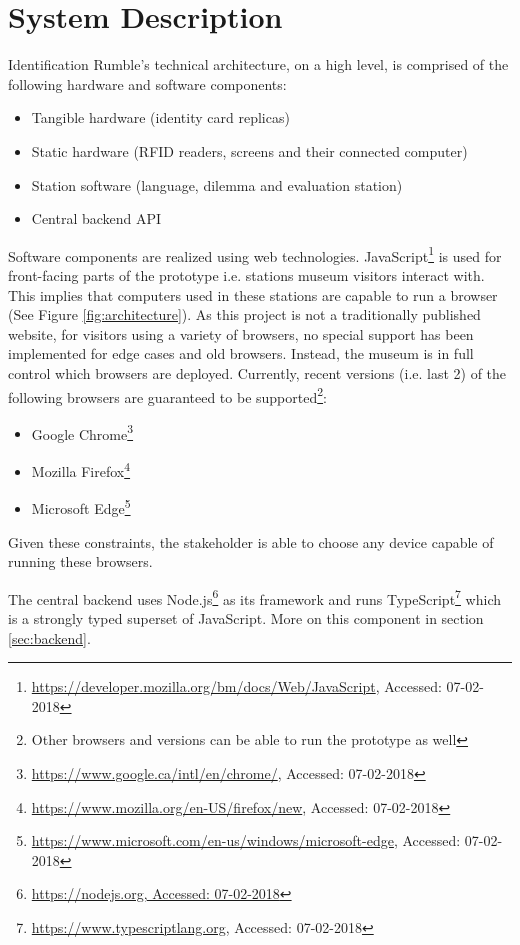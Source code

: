 
\section{System Description} \label{System_Description}
Identification Rumble's technical architecture, on a high level, is comprised of the following hardware and software components:

\begin{itemize}
  \item Tangible hardware (identity card replicas)
  \item Static hardware (RFID readers, screens and their connected computer)
  \item Station software (language, dilemma and evaluation station)
  \item Central backend API
\end{itemize}

Software components are realized using web technologies.
JavaScript\footnote{\url{https://developer.mozilla.org/bm/docs/Web/JavaScript}, Accessed: 07-02-2018} is used for front-facing parts of the prototype i.e. stations museum visitors interact with.
This implies that computers used in these stations are capable to run a browser (See Figure \ref{fig:architecture}).
As this project is not a traditionally published website, for visitors using a variety of browsers, no special support has been implemented for edge cases and old browsers.
Instead, the museum is in full control which browsers are deployed.
Currently, recent versions (i.e. last 2) of the following browsers are guaranteed to be supported\footnote{Other browsers and versions can be able to run the prototype as well}:

\begin{itemize}
  \item Google Chrome\footnote{\url{https://www.google.ca/intl/en/chrome/}, Accessed: 07-02-2018}
  \item Mozilla Firefox\footnote{\url{https://www.mozilla.org/en-US/firefox/new}, Accessed: 07-02-2018}
  \item Microsoft Edge\footnote{\url{https://www.microsoft.com/en-us/windows/microsoft-edge}, Accessed: 07-02-2018}
\end{itemize}

Given these constraints, the stakeholder is able to choose any device capable of running these browsers.

The central backend uses Node.js\footnote{\url{https://nodejs.org, Accessed: 07-02-2018}} as its framework and runs TypeScript\footnote{\url{https://www.typescriptlang.org}, Accessed: 07-02-2018} which is a strongly typed superset of JavaScript.
More on this component in section \ref{sec:backend}.


